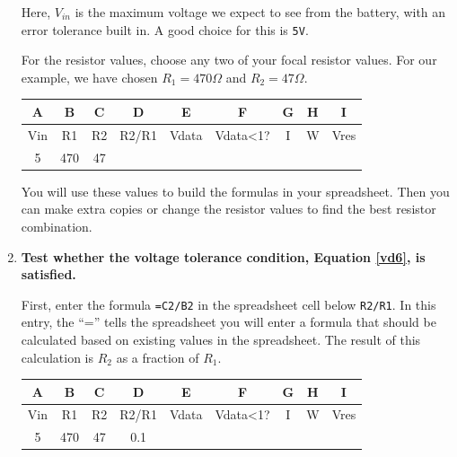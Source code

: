 \begin{enumerate}
	Here, $V_{in}$ is the maximum voltage we expect to see from the battery, with an error tolerance built in. 
	A good choice for this is \texttt{5V}.
	
	\smallskip
	For the resistor values, choose any two of your focal resistor values.
	For our example, we have chosen $R_1=470\Omega$ and $R_2=47\Omega$. 
	\begin{table}[H]
		\centering \begin{small}
		\begin{tabular}{|c|c|c|c|c|c|c|c|c|}
			\hline 
			\textbf{A}  & \textbf{B} & \textbf{C} & \textbf{D} & \textbf{E} & \textbf{F} & \textbf{G} & \textbf{H} & \textbf{I} \\ 
			\hline 
			Vin  & R1 & R2 & R2/R1 & Vdata & Vdata<1? & I & W & Vres \\ 
			\hline 
			5 & 470  & 47 &  &  &  &  &  &  \\ 
			\hline 
		\end{tabular} 
	\end{small}
	\end{table}
	You will use these values to build the formulas in your spreadsheet.
	Then you can make extra copies or change the resistor values to find the best resistor combination.	

	\item \textbf{Test whether the voltage tolerance condition, Equation \ref{vd6}, is satisfied.}

	First, enter the formula \lstinline{=C2/B2} in the spreadsheet cell below \texttt{R2/R1}.
	In this entry, the ``='' tells the spreadsheet you will enter a formula that should be calculated based on existing values in the spreadsheet.
	The result of this calculation is $R_2$ as a fraction of $R_1$.
	
	\begin{table}[H]
	\centering \begin{small}
	\begin{tabular}{|c|c|c|c|c|c|c|c|c|}
		\hline 
		\textbf{A}  & \textbf{B} & \textbf{C} & \textbf{D} & \textbf{E} & \textbf{F} & \textbf{G} & \textbf{H} & \textbf{I} \\ 
		\hline 
		Vin  & R1 & R2 & R2/R1 & Vdata & Vdata<1? & I & W & Vres \\ 
		\hline 
		5 & 470  & 47 & 0.1 &  &  &  &  &  \\ 
		\hline 
	\end{tabular} 
	\end{small}
	\end{table}
	

\end{enumerate}
